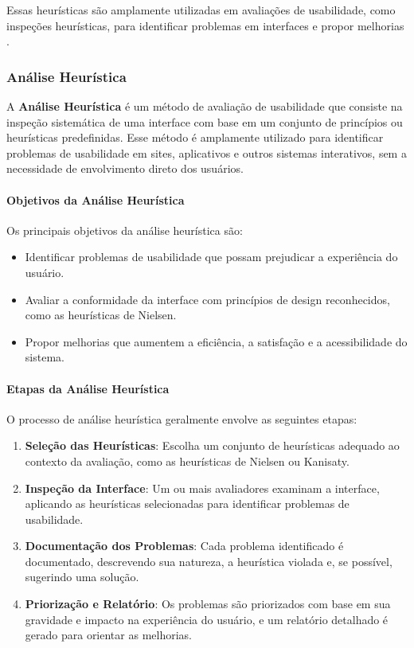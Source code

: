 Essas heurísticas são amplamente utilizadas em avaliações de usabilidade, como inspeções heurísticas, para identificar problemas em interfaces e propor melhorias \citep{Nielsen1994}.

\subsubsection{Análise Heurística}
A \textbf{Análise Heurística} é um método de avaliação de usabilidade que consiste na inspeção sistemática de uma interface com base em um conjunto de princípios ou heurísticas predefinidas. Esse método é amplamente utilizado para identificar problemas de usabilidade em sites, aplicativos e outros sistemas interativos, sem a necessidade de envolvimento direto dos usuários.

\paragraph{Objetivos da Análise Heurística}
Os principais objetivos da análise heurística são:

\begin{itemize}
    \item Identificar problemas de usabilidade que possam prejudicar a experiência do usuário.
    \item Avaliar a conformidade da interface com princípios de design reconhecidos, como as heurísticas de Nielsen.
    \item Propor melhorias que aumentem a eficiência, a satisfação e a acessibilidade do sistema.
\end{itemize}

\paragraph{Etapas da Análise Heurística}
O processo de análise heurística geralmente envolve as seguintes etapas:

\begin{enumerate}
    \item \textbf{Seleção das Heurísticas}: Escolha um conjunto de heurísticas adequado ao contexto da avaliação, como as heurísticas de Nielsen ou Kanisaty.
    
    \item \textbf{Inspeção da Interface}: Um ou mais avaliadores examinam a interface, aplicando as heurísticas selecionadas para identificar problemas de usabilidade.
    
    \item \textbf{Documentação dos Problemas}: Cada problema identificado é documentado, descrevendo sua natureza, a heurística violada e, se possível, sugerindo uma solução.
    
    \item \textbf{Priorização e Relatório}: Os problemas são priorizados com base em sua gravidade e impacto na experiência do usuário, e um relatório detalhado é gerado para orientar as melhorias.
\end{enumerate}

